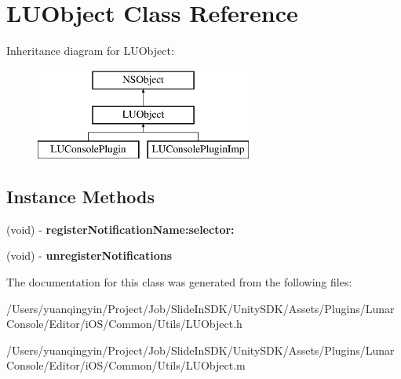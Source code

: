 \hypertarget{interface_l_u_object}{}\section{L\+U\+Object Class Reference}
\label{interface_l_u_object}
Inheritance diagram for L\+U\+Object\+:\begin{figure}[H]
\begin{center}
\leavevmode
\includegraphics[height=3.000000cm]{interface_l_u_object}
\end{center}
\end{figure}
\subsection*{Instance Methods}
\begin{DoxyCompactItemize}
\item 
\mbox{\label{interface_l_u_object_a99d5ed0b43b9c264c7ec7278861efe87}} 
(void) -\/ {\bfseries register\+Notification\+Name\+:selector\+:}
\item 
\mbox{\label{interface_l_u_object_aa68c0b5a2683b888e976a311f4ff4380}} 
(void) -\/ {\bfseries unregister\+Notifications}
\end{DoxyCompactItemize}


The documentation for this class was generated from the following files\+:\begin{DoxyCompactItemize}
\item 
/\+Users/yuanqingyin/\+Project/\+Job/\+Slide\+In\+S\+D\+K/\+Unity\+S\+D\+K/\+Assets/\+Plugins/\+Lunar\+Console/\+Editor/i\+O\+S/\+Common/\+Utils/L\+U\+Object.\+h\item 
/\+Users/yuanqingyin/\+Project/\+Job/\+Slide\+In\+S\+D\+K/\+Unity\+S\+D\+K/\+Assets/\+Plugins/\+Lunar\+Console/\+Editor/i\+O\+S/\+Common/\+Utils/L\+U\+Object.\+m\end{DoxyCompactItemize}
